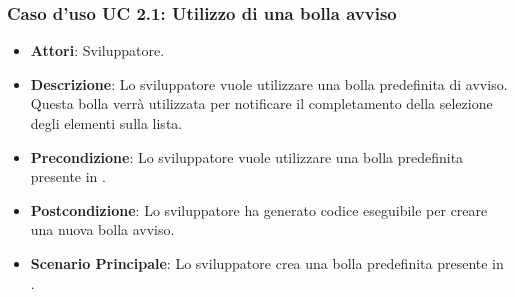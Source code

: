 \subsubsection{Caso d'uso UC 2.1: Utilizzo di una bolla avviso}

\FloatBarrier
\begin{itemize}
\item\textbf{Attori}: Sviluppatore.
\item\textbf{Descrizione}: Lo sviluppatore vuole utilizzare una bolla predefinita di avviso. Questa bolla verrà utilizzata per notificare il completamento della selezione degli elementi sulla lista.
\item\textbf{Precondizione}: Lo sviluppatore vuole utilizzare una bolla predefinita presente in \progetto.
\item\textbf{Postcondizione}: Lo sviluppatore ha generato codice eseguibile per creare una nuova bolla avviso.
\item\textbf{Scenario Principale}: Lo sviluppatore crea una bolla predefinita presente in \progetto.
\end{itemize}